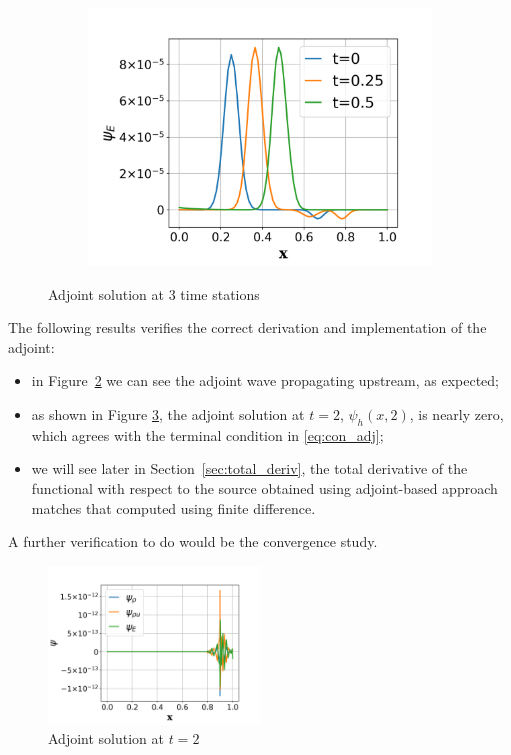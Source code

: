 \documentclass[a4paper]{article}
\begin{document}
\begin{figure}
\begin{subfigure}{0.475\textwidth}
    \includegraphics[width=1.0\linewidth]{figures/psi_E.png}
    \label{fig:psi_E}
  \end{subfigure}
  \caption{Adjoint solution at 3 time stations}
  \label{fig:adj_distri}
\end{figure}

The following results verifies the correct derivation and implementation of the adjoint:
\begin{itemize}
  \item in Figure~\ref{fig:adj_distri} we can see the adjoint wave propagating upstream, as expected;
  \item as shown in Figure \ref{fig:adj_t=2}, the adjoint solution at $t=2$, $\psi_h(x,2)$, is nearly zero, which agrees with the terminal condition in \eqref{eq:con_adj};
  \item we will see later in Section~\ref{sec:total_deriv}, the total derivative of the functional with respect to the source obtained using adjoint-based approach matches that computed using finite difference.
  
\end{itemize}
A further verification to do would be the convergence study. 
\begin{figure}
  \centering
  \includegraphics[width=0.5\textwidth]{figures/psi_t=2.png}
  \caption{Adjoint solution at $t=2$}
  \label{fig:adj_t=2}
\end{figure}
\end{document}
